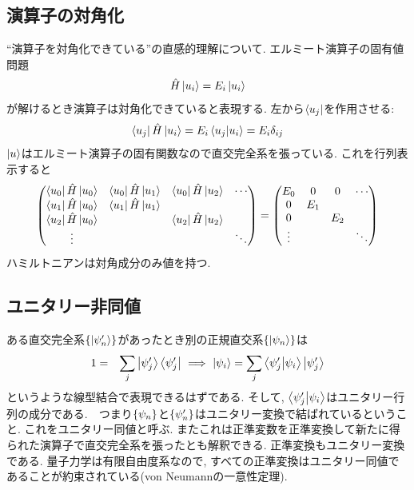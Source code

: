 \documentclass[10.5pt,a4paper]{jreport}
\begin{document}
\subsection{演算子の対角化}
``演算子を対角化できている''の直感的理解について. エルミート演算子の固有値問題
\begin{eqnarray}
  \hat{H}\ket{u_i} = E_i\ket{u_i}
\end{eqnarray}
が解けるとき演算子は対角化できていると表現する. 左から$\bra{u_j}$を作用させる:
\begin{eqnarray}
  \bra{u_j}\hat{H}\ket{u_i} = E_i\bra{u_j}\ket{u_i} = E_i\delta_{ij}
\end{eqnarray}
$\ket{u}$はエルミート演算子の固有関数なので直交完全系を張っている. これを行列表示すると
\begin{eqnarray}
  \begin{pmatrix}
    \bra{u_0}\hat{H}\ket{u_0}&\bra{u_0}\hat{H}\ket{u_1}&\bra{u_0}\hat{H}\ket{u_2}&\cdots\\
    \bra{u_1}\hat{H}\ket{u_0}&\bra{u_1}\hat{H}\ket{u_1}&&\\
    \bra{u_2}\hat{H}\ket{u_0}&&\bra{u_2}\hat{H}\ket{u_2}&\\
    \vdots&&&\ddots
  \end{pmatrix}
  =
    \begin{pmatrix}
    E_0&0&0&\cdots\\
    0&E_1&&\\
    0&&E_2&\\
    \vdots&&&\ddots
  \end{pmatrix}
\end{eqnarray}
ハミルトニアンは対角成分のみ値を持つ.
\subsection{ユニタリー非同値}
ある直交完全系$\{\ket{\psi'_n}\}$があったとき別の正規直交系$\{\ket{\psi_n}\}$は
\begin{eqnarray}
  1 &=& \sum_j\ket{\psi'_j}\bra{\psi'_j}\ \Longrightarrow\ \ket{\psi_i} = \sum_j \bra{\psi'_j}\ket{\psi_i}\ket{\psi'_j}
\end{eqnarray}
というような線型結合で表現できるはずである. そして, $\bra{\psi'_j}\ket{\psi_i}$はユニタリー行列の成分である.　つまり$\qty{\psi_n}$と$\qty{\psi'_n}$はユニタリー変換で結ばれているということ. これをユニタリー同値と呼ぶ. またこれは正準変数を正準変換して新たに得られた演算子で直交完全系を張ったとも解釈できる. 正準変換もユニタリー変換である. 量子力学は有限自由度系なので, すべての正準変換はユニタリー同値であることが約束されている(von Neumannの一意性定理).
\end{document}
